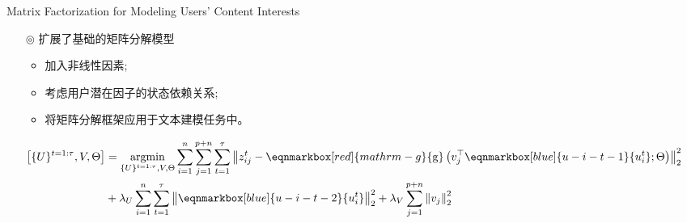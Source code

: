 \documentclass{beamer}
\begin{document}
\begin{frame}[allowframebreaks]{Matrix Factorization for Modeling Users' Content Interests}
\begin{itemize}
		\item[$\circledcirc$] 扩展了基础的矩阵分解模型
		      \begin{itemize}
			      \item 加入非线性因素\citep{trusov2016crumbs};
			      \item 考虑用户潜在因子的状态依赖关系;
			      \item 将矩阵分解框架应用于文本建模任务中。
		      \end{itemize}
	\end{itemize}
	\begin{align*}
		\begin{aligned}
			{\left[\{U\}^{t=1: \tau}, V, \Theta\right] } & =\underset{\{U\}^{t=1: \tau}, V, \Theta}{\operatorname{argmin}} \sum_{i=1}^n \sum_{j=1}^{p+n} \sum_{t=1}^\tau\left\|z_{i j}^t-\eqnmarkbox[red]{mathrm-g}{\mathrm{g}}\left(v_j^{\top} \eqnmarkbox[blue]{u-i-t-1}{u_i^t} ; \Theta\right)\right\|_2^2 \\
			& +\lambda_U \sum_{i=1}^n \sum_{t=1}^\tau\left\|\eqnmarkbox[blue]{u-i-t-2}{u_i^t}\right\|_2^2+\lambda_V \sum_{j=1}^{p+n}\left\|v_j\right\|_2^2
		\end{aligned}
	\end{align*}

\end{frame}
\end{document}
